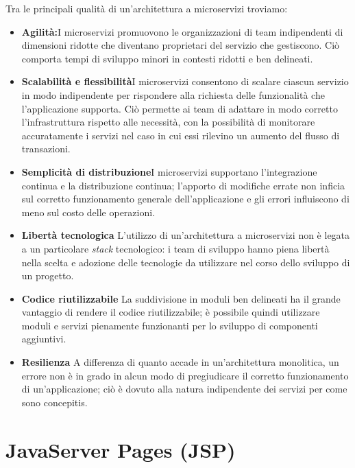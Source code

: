 Tra le principali qualità di un'architettura a microservizi troviamo:

\begin{itemize}
	\item \textbf{Agilità:}I microservizi promuovono le organizzazioni di team indipendenti di dimensioni ridotte che diventano proprietari del servizio che gestiscono. Ciò comporta tempi di sviluppo minori in contesti ridotti e ben delineati.
	\item \textbf{Scalabilità e flessibilità}I microservizi consentono di scalare ciascun servizio in modo indipendente per rispondere alla richiesta delle funzionalità che l'applicazione supporta. Ciò permette ai team di adattare in modo corretto l’infrastruttura rispetto alle necessità, con la possibilità di monitorare accuratamente i servizi nel caso in cui essi rilevino un aumento del flusso di transazioni.
	\item \textbf{Semplicità di distribuzione}I microservizi supportano l’integrazione continua e la distribuzione continua; l'apporto di modifiche errate non inficia sul corretto funzionamento generale dell'applicazione e gli errori influiscono di meno sul costo delle operazioni. 
	\item \textbf{Libertà tecnologica} L'utilizzo di un'architettura a microservizi non è legata a un particolare \textit{stack} tecnologico: i team di sviluppo hanno piena libertà nella scelta e adozione delle tecnologie da utilizzare nel corso dello sviluppo di un progetto.
	\item \textbf{Codice riutilizzabile} La suddivisione in moduli ben delineati ha il grande vantaggio di rendere il codice riutilizzabile; è possibile quindi utilizzare moduli e servizi pienamente funzionanti per lo sviluppo di componenti aggiuntivi.
	\item \textbf{Resilienza} A differenza di quanto accade in un'architettura monolitica, un errore non è in grado in alcun modo di pregiudicare il corretto funzionamento di un'applicazione; ciò è dovuto alla natura indipendente dei servizi per come sono concepitis.
	
\end{itemize}


\section{JavaServer Pages (JSP)}\label{jsp}